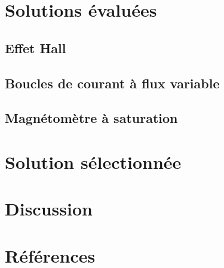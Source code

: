 \documentclass[11pt,a4paper]{article}
\begin{document}
\section{Solutions évaluées}
\subsection{Effet Hall}

\subsection{Boucles de courant à flux variable}

\subsection{Magnétomètre à saturation}


\section{Solution sélectionnée}



\section{Discussion}


\section{Références}

\end{document}
